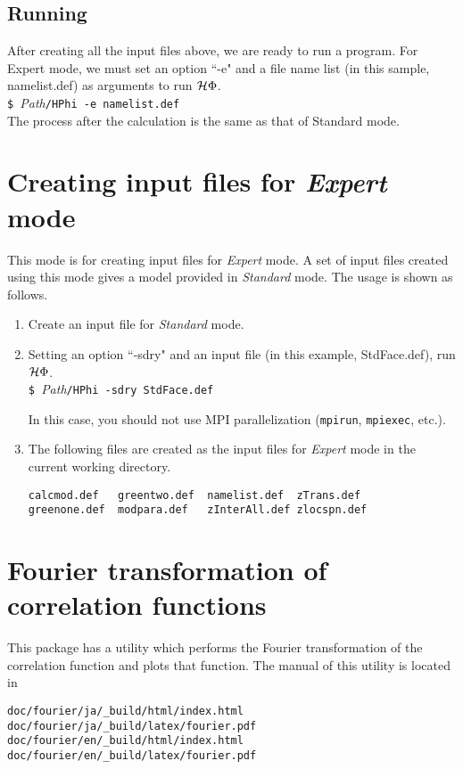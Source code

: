 \subsection{Running}
After creating all the input files above, we are ready to run a program.
For Expert mode, we must set an option ``-e" and a file name list (in this sample, namelist.def) as arguments to run $\mathcal{H} \Phi$.\\
\verb|$ |\textit{Path}\verb|/HPhi -e namelist.def|\\
The process after the calculation is the same as that of Standard mode.

\newpage
\section{Creating input files for {\it Expert} mode}
This mode is for creating input files for {\it Expert} mode.
A set of input files created using this mode gives a model provided in {\it Standard} mode.
The usage is shown as follows.
\begin{enumerate}
\item{Create an input file for {\it Standard} mode.}
\item{Setting an option ``-sdry" and an input file (in this example, StdFace.def), run $\mathcal{H} \Phi$.}\\
\verb|$ |\textit{Path}\verb|/HPhi -sdry StdFace.def|

In this case, you should not use MPI parallelization (\verb|mpirun|, \verb|mpiexec|, etc.).
\item{The following files are created as the input files for {\it Expert} mode in the current working directory.}\\
\begin{minipage}{12cm}
\begin{screen}
\begin{verbatim}
calcmod.def   greentwo.def  namelist.def  zTrans.def
greenone.def  modpara.def   zInterAll.def zlocspn.def
\end{verbatim}
\end{screen}
\end{minipage}
\end{enumerate}

\section{Fourier transformation of correlation functions}

This package has a utility which performs the Fourier transformation of the correlation function and plots that function.
The manual of this utility is located in
\begin{verbatim}
doc/fourier/ja/_build/html/index.html
doc/fourier/ja/_build/latex/fourier.pdf
doc/fourier/en/_build/html/index.html
doc/fourier/en/_build/latex/fourier.pdf
\end{verbatim}
